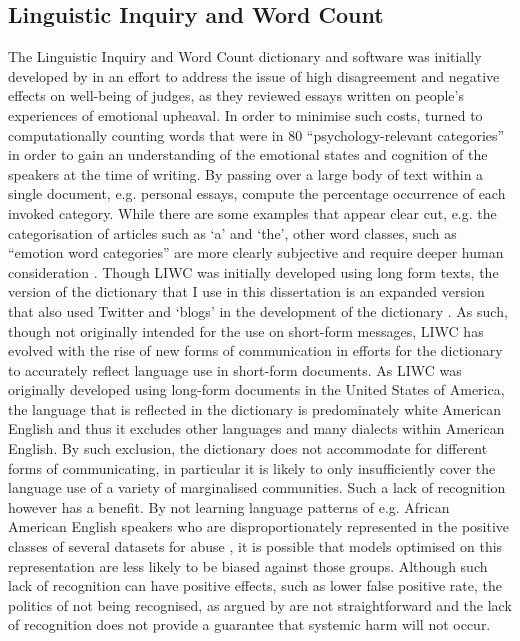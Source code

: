 \subsection{Linguistic Inquiry and Word Count}
The Linguistic Inquiry and Word Count dictionary and software was initially developed by \citet{Pennebaker:2001} in an effort to address the issue of high disagreement and negative effects on well-being of judges, as they reviewed essays written on people's experiences of emotional upheaval.
In order to minimise such costs, \citet{Pennebaker:2001} turned to computationally counting words that were in $80$ ``psychology-relevant categories'' in order to gain an understanding of the emotional states and cognition of the speakers at the time of writing.
By passing over a large body of text within a single document, e.g. personal essays, \citet{Pennebaker:2001} compute the percentage occurrence of each invoked category.
While there are some examples that appear clear cut, e.g. the categorisation of articles such as `a' and `the', other word classes, such as ``emotion word categories'' are more clearly subjective and require deeper human consideration \citep{Tausczik:2010}.
Though LIWC was initially developed using long form texts, the version of the dictionary that I use in this dissertation is an expanded version that also used Twitter and `blogs' in the development of the dictionary \citep{Pennebaker:2015}.
As such, though not originally intended for the use on short-form messages, LIWC has evolved with the rise of new forms of communication in efforts for the dictionary to accurately reflect language use in short-form documents.
As LIWC was originally developed using long-form documents in the United States of America, the language that is reflected in the dictionary is predominately white American English and thus it excludes other languages and many dialects within American English.
By such exclusion, the dictionary does not accommodate for different forms of communicating, in particular it is likely to only insufficiently cover the language use of a variety of marginalised communities.
Such a lack of recognition however has a benefit.
By not learning language patterns of e.g. African American English speakers who are disproportionately represented in the positive classes of several datasets for abuse \citep{Waseem:2018,Davidson:2019}, it is possible that models optimised on this representation are less likely to be biased against those groups.
Although such lack of recognition can have positive effects, such as lower false positive rate, the politics of not being recognised, as argued by \citet{Benjamin:2019} are not straightforward and the lack of recognition does not provide a guarantee that systemic harm will not occur.
